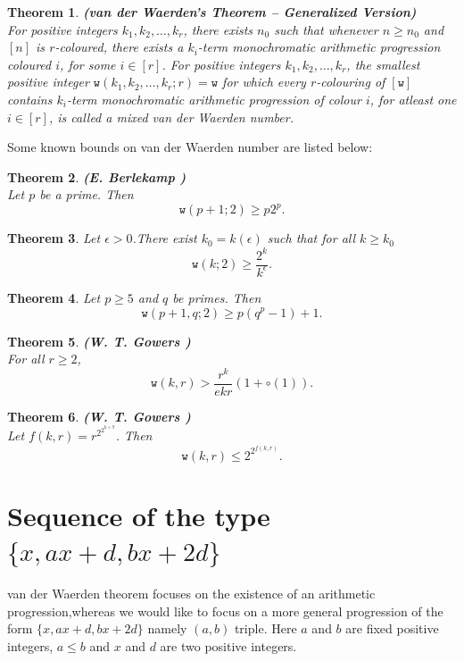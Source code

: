 \documentclass[12pt]{report}
\def\w{\mathtt w}
\newtheorem{thm}{Theorem}[chapter]
\begin{document}
\begin{thm}{\bf (van der Waerden's Theorem -- Generalized Version)}\\[5pt] 
For positive integers $k_1, k_2, \ldots, k_r$, there exists $n_0$ such that whenever $n \ge n_0$ and $[n]$ is $r$-coloured, there exists a $k_i$-term monochromatic arithmetic progression coloured $i$, for some $i \in [r]$. For positive integers $k_1, k_2, \ldots, k_r$, the smallest positive integer ${\w}(k_1, k_2, \ldots, k_r; r)=\w$ for which every $r$-colouring of $[{\w}]$ contains $k_i$-term monochromatic arithmetic progression of colour $i$, for atleast one $i \in [r]$, is called a mixed van der Waerden number.
\end{thm} 

\noindent Some known bounds on van der Waerden number are listed below:\\

\begin{thm}  {\bf (E. Berlekamp \cite{EB})} \\[5pt]
Let $p$ be a prime. Then 
\[ {\w}(p+1;2) \ge p2^p. \]
\end{thm}

\begin{thm}
Let $\epsilon>0$.There exist $k_{0}=k(\epsilon)$ such that for all $k \geq k_0$ 
\[ {\w}(k;2) \geq \frac{2^{k}}{k^{\epsilon}}. \]
\end{thm}

\begin{thm}
Let $p \geq 5$ and $q$ be primes. Then 
\[ {\w}(p+1,q;2) \geq p(q^p-1)+1. \]
\end{thm}

\begin{thm}  {\bf (W. T. Gowers \cite{TG})} \\[5pt]
For all $r\geq 2$,
$${\w}(k,r)>\frac{r^k}{ekr}(1+\circ (1)).$$
\end{thm}

\begin{thm}{\bf (W. T. Gowers \cite{TG})} \\[5pt]
Let $f(k,r)= r^{2^{2^{k+9}}}$. Then 
\[ \w(k,r) \leq 2^{2^{f(k,r)}}. \]
\end{thm}

\section{Sequence of the type $\big\{x,ax+d,bx+2d\big\}$}

\noindent van der Waerden theorem focuses on the existence of an arithmetic progression,whereas we would like to focus on a more general progression of the form $\big\{x,ax+d,bx+2d\big\}$ namely $(a,b)$ triple. Here $a$ and $b$ are fixed positive integers, $a \leq b$  and $x$ and $d$ are two positive integers.\\
\end{document}
